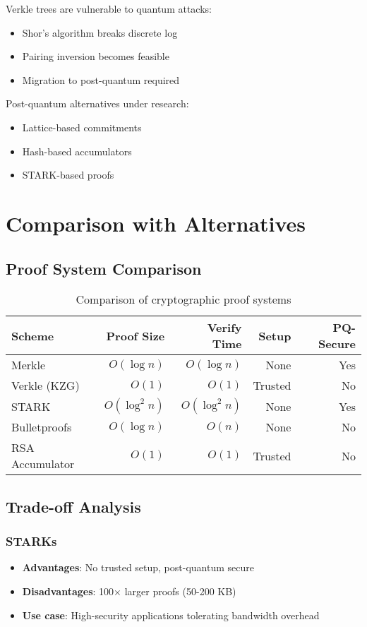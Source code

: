 \documentclass[11pt,a4paper]{article}
\theoremstyle{definition}
\begin{document}
Verkle trees are vulnerable to quantum attacks:
\begin{itemize}
    \item Shor's algorithm breaks discrete log
    \item Pairing inversion becomes feasible
    \item Migration to post-quantum required
\end{itemize}

Post-quantum alternatives under research:
\begin{itemize}
    \item Lattice-based commitments
    \item Hash-based accumulators
    \item STARK-based proofs
\end{itemize}

\section{Comparison with Alternatives}

\subsection{Proof System Comparison}

\begin{table}[H]
\centering
\begin{tabular}{@{}lrrrr@{}}
\toprule
\textbf{Scheme} & \textbf{Proof Size} & \textbf{Verify Time} & \textbf{Setup} & \textbf{PQ-Secure} \\
\midrule
Merkle & $O(\log n)$ & $O(\log n)$ & None & Yes \\
Verkle (KZG) & $O(1)$ & $O(1)$ & Trusted & No \\
STARK & $O(\log^2 n)$ & $O(\log^2 n)$ & None & Yes \\
Bulletproofs & $O(\log n)$ & $O(n)$ & None & No \\
RSA Accumulator & $O(1)$ & $O(1)$ & Trusted & No \\
\bottomrule
\end{tabular}
\caption{Comparison of cryptographic proof systems}
\label{tab:proof-comparison}
\end{table}

\subsection{Trade-off Analysis}

\subsubsection{STARKs}
\begin{itemize}
    \item \textbf{Advantages}: No trusted setup, post-quantum secure
    \item \textbf{Disadvantages}: 100× larger proofs (50-200 KB)
    \item \textbf{Use case}: High-security applications tolerating bandwidth overhead
\end{itemize}
\end{document}
